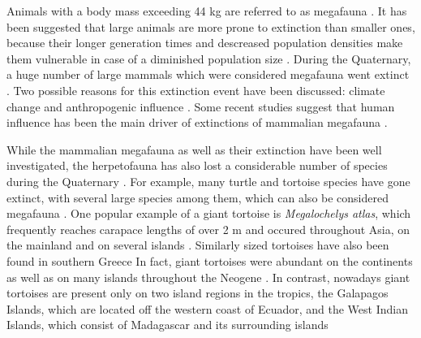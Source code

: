 Animals with a body mass exceeding 44 kg are referred to as megafauna \citep{Barnosky2004, Rhodin2015, Sandom2014,Koch2006}.
It has been suggested that large animals are more prone to extinction than smaller ones, because their longer generation times and descreased population densities make them vulnerable in case of a diminished population size \citep{Koch2006}. 
During the Quaternary, a huge number of large mammals which were considered megafauna went extinct \citep{Lyons2008,Smith2016,Koch2006}.
Two possible reasons for this extinction event have been discussed:
climate change and anthropogenic influence \citep{Koch2006}.
Some recent studies suggest that human influence has been the main driver of extinctions of mammalian megafauna \citep{Barnosky2004,Sandom2014,Gibbons2004,Schuster2000}.


While the mammalian megafauna as well as their extinction %
have been well investigated, the herpetofauna has also lost a considerable number of species during the Quaternary \citep{Blain2016}. 
For example, many turtle and tortoise species have gone extinct, with several large species among them, which can also be considered megafauna \citep{Rhodin2015,Froyd2014,Pedrono2013}.
One popular example of a giant tortoise is \textit{Megalochelys atlas}, which frequently reaches carapace lengths of over 2 m and occured throughout Asia, on the mainland and on several islands \citep{Arnold1979}. Similarly sized tortoises have also been found in southern Greece \citep{Bachmayer1979}
In fact, giant tortoises were abundant on the continents as well as on many islands throughout the Neogene \citep{DeLapparentdeBroin2002}. In contrast, nowadays giant tortoises are present only on two island regions in the tropics, the Galapagos Islands, which are located off the western coast of Ecuador, and the West Indian Islands, which consist of Madagascar and its surrounding islands \citep{Baur1889,Braithwaite2016}





